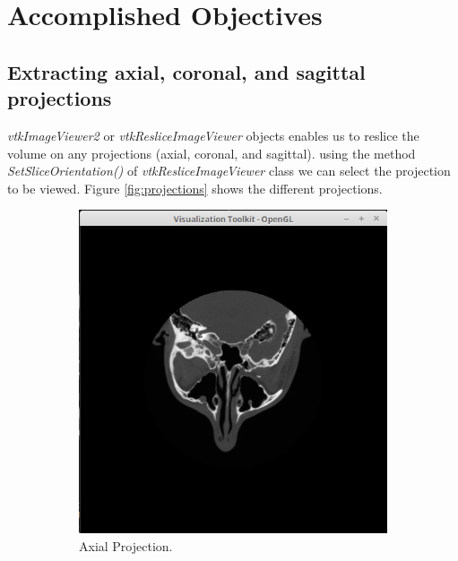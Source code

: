 \documentclass[10pt, b5paper]{article}
\begin{document}
\section{Accomplished Objectives}
\subsection{Extracting axial, coronal, and sagittal projections}
\textit{vtkImageViewer2} or \textit{vtkResliceImageViewer} objects enables us to reslice the volume on any projections (axial, coronal, and sagittal). using the method \textit{SetSliceOrientation()} of \textit{vtkResliceImageViewer} class we can select the projection to be viewed.
Figure \ref{fig:projections} shows the different projections.
\begin{figure}
    \centering
    \begin{subfigure}[b]{0.33\textwidth}
        \centering
        \includegraphics[width=\textwidth]{axial}
        \caption{Axial Projection.}
    \end{subfigure}
    \hfill
    \begin{subfigure}[b]{0.33\textwidth}
        \centering

\end{subfigure}
\end{figure}
\end{document}
